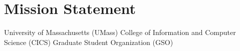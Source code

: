\section{Mission Statement}
\label{sec:mission}
University of Massachusetts (UMass)
College of Information and Computer Science (CICS)
Graduate Student Organization (GSO)	